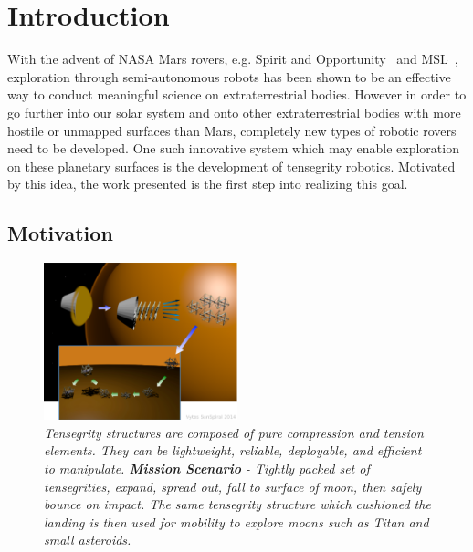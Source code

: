 \chapter{Introduction}

With the advent of NASA Mars rovers, e.g. Spirit and Opportunity~\cite{maimone2007overview} and MSL~\cite{grotzinger2012mars}, exploration through semi-autonomous robots has been shown to be an effective way to conduct meaningful science on extraterrestrial bodies. 
However in order to go further into our solar system and onto other extraterrestrial bodies with more hostile or unmapped surfaces than Mars, completely new types of robotic rovers need to be developed.
One such innovative system which may enable exploration on these planetary surfaces is the development of tensegrity robotics.
Motivated by this idea, the work presented is the first step into realizing this goal.

\section{Motivation}

\begin{figure}[htb]
   \centering
   \includegraphics[width=0.5\textwidth]{tex/img/fig_aeroshell_summary} 
   \caption{{\em Tensegrity structures are composed of pure compression and tension elements. They can be lightweight, reliable, deployable, and efficient to manipulate. {\bf Mission Scenario} - Tightly packed set of tensegrities, expand, spread out, fall to surface of moon, then safely bounce on impact. The same tensegrity structure which cushioned the landing is then used for mobility to explore moons such as Titan and small asteroids.}}
   \label{fig:unpack}
\end{figure}

